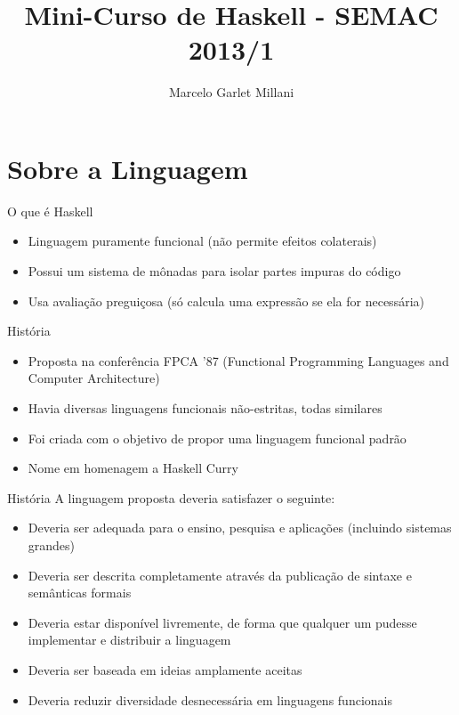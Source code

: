 \documentclass{beamer}
\title{Mini-Curso de Haskell - SEMAC 2013/1}
\author[M. Millani]{Marcelo Garlet Millani}
\institute[II/UFRGS]{Universidade Federal do Rio Grande do Sul \\ Instituto de Informática \\ Grupo PET Computação}
\begin{document}
	\begin{frame}
		\maketitle
	\end{frame}

\section{Sobre a Linguagem}

	\begin{frame}{}
	\end{frame}

	\begin{frame}{O que é Haskell}
		\begin{itemize}
		 \item Linguagem puramente funcional (não permite efeitos colaterais)
		 \item Possui um sistema de mônadas para isolar partes impuras do código
		 \item Usa avaliação preguiçosa (só calcula uma expressão se ela for necessária)
		\end{itemize}
	\end{frame}
	
	\begin{frame}{História}
	 
	 \begin{itemize}
	  \item Proposta na conferência FPCA '87 (Functional Programming Languages and Computer Architecture)
	  \item Havia diversas linguagens funcionais não-estritas, todas similares
	  \item Foi criada com o objetivo de propor uma linguagem funcional padrão
	  \item Nome em homenagem a Haskell Curry
	 \end{itemize}
	\end{frame}
	
	\begin{frame}{História}
	 A linguagem proposta deveria satisfazer o seguinte:
	 \begin{itemize}
	  \item Deveria ser adequada para o ensino, pesquisa e aplicações (incluindo sistemas grandes)
	  \item Deveria ser descrita completamente através da publicação de sintaxe e semânticas formais
	  \item Deveria estar disponível livremente, de forma que qualquer um pudesse implementar e distribuir a linguagem
	  \item Deveria ser baseada em ideias amplamente aceitas
	  \item Deveria reduzir diversidade desnecessária em linguagens funcionais
	 \end{itemize}
	\end{frame}
	
\end{document}
